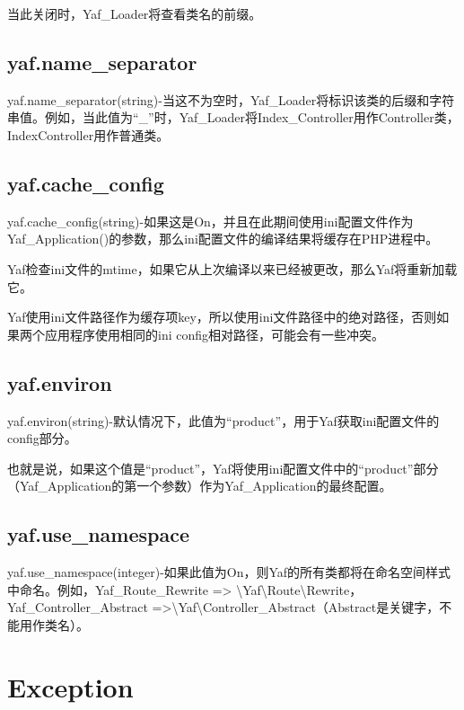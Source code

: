 当此关闭时，Yaf\_Loader将查看类名的前缀。

\subsection{yaf.name\_separator}

yaf.name\_separator(string)-当这不为空时，Yaf\_Loader将标识该类的后缀和字符串值。例如，当此值为“\_”时，Yaf\_Loader将Index\_Controller用作Controller类，IndexController用作普通类。

\subsection{yaf.cache\_config}

yaf.cache\_config(string)-如果这是On，并且在此期间使用ini配置文件作为Yaf\_Application()的参数，那么ini配置文件的编译结果将缓存在PHP进程中。

Yaf检查ini文件的mtime，如果它从上次编译以来已经被更改，那么Yaf将重新加载它。

Yaf使用ini文件路径作为缓存项key，所以使用ini文件路径中的绝对路径，否则如果两个应用程序使用相同的ini config相对路径，可能会有一些冲突。


\subsection{yaf.environ}

yaf.environ(string)-默认情况下，此值为“product”，用于Yaf获取ini配置文件的config部分。

也就是说，如果这个值是“product”，Yaf将使用ini配置文件中的“product”部分（Yaf\_Application的第一个参数）作为Yaf\_Application的最终配置。

\subsection{yaf.use\_namespace}

yaf.use\_namespace(integer)-如果此值为On，则Yaf的所有类都将在命名空间样式中命名。例如，Yaf\_Route\_Rewrite => \textbackslash Yaf\textbackslash Route\textbackslash Rewrite，Yaf\_Controller\_Abstract =>\textbackslash Yaf\textbackslash Controller\_Abstract（Abstract是关键字，不能用作类名）。



\section{Exception}

